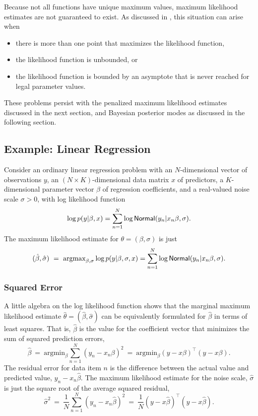 Because not all functions have unique maximum values, maximum
likelihood estimates are not guaranteed to exist.  As discussed in
, this situation can arise when
%
\begin{itemize}
\item there is more than one point that maximizes the likelihood function,
\item the likelihood function is unbounded, or
\item the likelihood function is bounded by an asymptote that is never
  reached for legal parameter values.
\end{itemize}
%
These problems persist with the penalized maximum likelihood estimates
discussed in the next section, and Bayesian posterior modes as
discussed in the following section.  


\subsection{Example: Linear Regression}

Consider an ordinary linear regression problem with an $N$-dimensional
vector of observations $y$, an $(N \times K)$-dimensional data matrix
$x$ of predictors, a $K$-dimensional parameter vector $\beta$ of
regression coefficients, and a real-valued noise scale $\sigma > 0$,
with log likelihood function
\[
\log p(y|\beta,x) = \sum_{n=1}^N \log \distro{Normal}(y_n|x_n \beta,
\sigma).
\]
%
The maximum likelihood estimate for $\theta = (\beta,\sigma)$ is just
\[
(\hat{\beta},\hat{\sigma})
\ = \
\mbox{argmax}_{\beta,\sigma} 
\log p(y|\beta,\sigma,x) = \sum_{n=1}^N \log \distro{Normal}(y_n|x_n \beta, \sigma).
\]

\subsubsection{Squared Error}

A little algebra on the log likelihood function shows that the
marginal maximum likelihood estimate $\hat{\theta} =
(\hat{\beta},\hat{\sigma})$ can be equivalently formulated for
$\hat{\beta}$ in terms of least squares.  That is, $\hat{\beta}$ is
the value for the coefficient vector that minimizes the sum of squared
prediction errors,
%
\[
\hat{\beta} 
\ = \
\mbox{argmin}_{\beta} \sum_{n=1}^N (y_n - x_n \beta)^2
\ = \ 
\mbox{argmin}_{\beta} (y - x \beta)^{\top} (y - x\beta).
\]
%
The residual error for data item $n$ is the difference between the
actual value and predicted value, $y_n - x_n \hat{\beta}$.  The
maximum likelihood estimate for the noise scale, $\hat{\sigma}$ is
just the square root of the average squared residual, 
\[
\hat{\sigma}^2
\ = \
\frac{1}{N} \sum_{n=1}^N \left( y_n - x_n \hat{\beta} \right)^2
\ = \
\frac{1}{N} (y - x \hat{\beta})^{\top} (y - x\hat{\beta}).
\]

